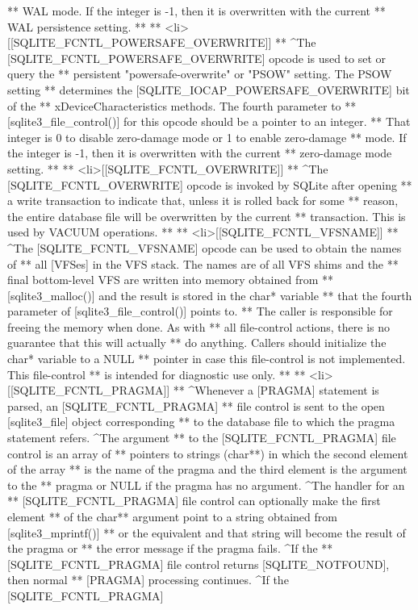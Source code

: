 \begin{Codex}[label=sqlite3.h,numbers=left]
{** WAL mode.  If the integer is -1, then it is overwritten with the current
** WAL persistence setting.
**
** <li>[[SQLITE_FCNTL_POWERSAFE_OVERWRITE]]
** ^The [SQLITE_FCNTL_POWERSAFE_OVERWRITE] opcode is used to set or query the
** persistent "powersafe-overwrite" or "PSOW" setting.  The PSOW setting
** determines the [SQLITE_IOCAP_POWERSAFE_OVERWRITE] bit of the
** xDeviceCharacteristics methods. The fourth parameter to
** [sqlite3_file_control()] for this opcode should be a pointer to an integer.
** That integer is 0 to disable zero-damage mode or 1 to enable zero-damage
** mode.  If the integer is -1, then it is overwritten with the current
** zero-damage mode setting.
**
** <li>[[SQLITE_FCNTL_OVERWRITE]]
** ^The [SQLITE_FCNTL_OVERWRITE] opcode is invoked by SQLite after opening
** a write transaction to indicate that, unless it is rolled back for some
** reason, the entire database file will be overwritten by the current 
** transaction. This is used by VACUUM operations.
**
** <li>[[SQLITE_FCNTL_VFSNAME]]
** ^The [SQLITE_FCNTL_VFSNAME] opcode can be used to obtain the names of
** all [VFSes] in the VFS stack.  The names are of all VFS shims and the
** final bottom-level VFS are written into memory obtained from 
** [sqlite3_malloc()] and the result is stored in the char* variable
** that the fourth parameter of [sqlite3_file_control()] points to.
** The caller is responsible for freeing the memory when done.  As with
** all file-control actions, there is no guarantee that this will actually
** do anything.  Callers should initialize the char* variable to a NULL
** pointer in case this file-control is not implemented.  This file-control
** is intended for diagnostic use only.
**
** <li>[[SQLITE_FCNTL_PRAGMA]]
** ^Whenever a [PRAGMA] statement is parsed, an [SQLITE_FCNTL_PRAGMA] 
** file control is sent to the open [sqlite3_file] object corresponding
** to the database file to which the pragma statement refers. ^The argument
** to the [SQLITE_FCNTL_PRAGMA] file control is an array of
** pointers to strings (char**) in which the second element of the array
** is the name of the pragma and the third element is the argument to the
** pragma or NULL if the pragma has no argument.  ^The handler for an
** [SQLITE_FCNTL_PRAGMA] file control can optionally make the first element
** of the char** argument point to a string obtained from [sqlite3_mprintf()]
** or the equivalent and that string will become the result of the pragma or
** the error message if the pragma fails. ^If the
** [SQLITE_FCNTL_PRAGMA] file control returns [SQLITE_NOTFOUND], then normal 
** [PRAGMA] processing continues.  ^If the [SQLITE_FCNTL_PRAGMA]
}
\end{Codex}
